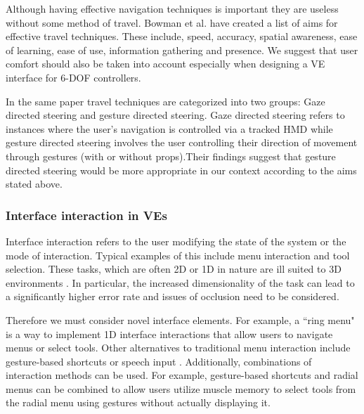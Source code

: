 \documentclass{sig-alternate-05-2015}
\begin{document}
Although having effective navigation techniques is important they are useless without some method of travel. Bowman et al. have created a list of aims for effective travel techniques.\cite{Bowman1997} These include, speed, accuracy, spatial awareness, ease of learning, ease of use, information gathering and presence. We suggest that user comfort should also be taken into account especially when designing a VE interface for 6-DOF controllers.

 In the same paper travel techniques are categorized into two groups: Gaze directed steering and gesture directed steering\cite{Bowman1997}. Gaze directed steering refers to instances where the user's navigation is controlled via a tracked HMD while gesture directed  steering involves the user controlling their direction of movement through gestures (with or without props).Their findings suggest that gesture directed steering would be more appropriate in our context according to the aims stated above.
 


\subsubsection{Interface interaction in VEs}
 Interface interaction refers to the user modifying the state of the system or the mode of interaction\cite{Bowman2001}. Typical examples of this include menu interaction and tool selection. These tasks, which are often 2D or 1D in nature are ill suited to 3D environments \cite{Bowman2001, Hand1997}. In particular, the increased dimensionality of the task can lead to a significantly higher error rate and issues of occlusion need to be considered\cite{Hand1997}.
 
Therefore we must consider novel interface elements. For example, a ``ring menu" is a way to implement 1D interface interactions that allow users to navigate menus or select tools\cite{Hand1997}. Other alternatives to traditional menu interaction include gesture-based shortcuts\cite{Zeleznik2007} or speech input \cite{VanDam1997,Bowman2001,Hand1997}. Additionally, combinations of interaction methods can be used. For example, gesture-based shortcuts and radial menus can be combined to allow users utilize muscle memory to select tools from the radial menu using gestures without actually displaying it.\cite{Kurtenbach1993}\\
 
\end{document}
